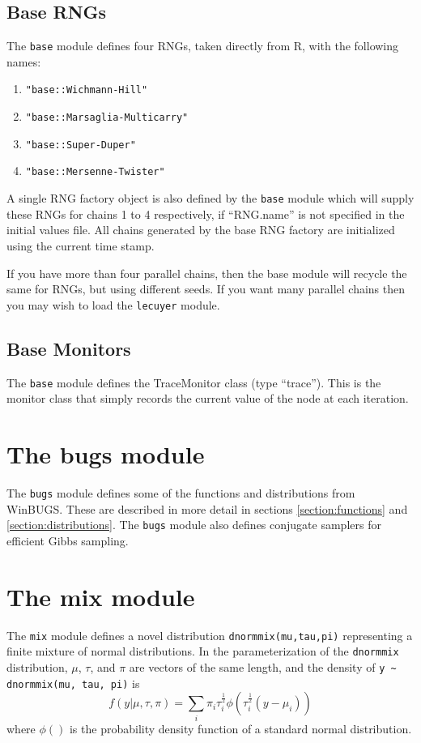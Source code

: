 \documentclass[11pt, a4paper, titlepage]{report}
\newcommand{\WinBUGS}{\textsf{WinBUGS}}
\newcommand{\R}{\textsf{R}}
\begin{document}
\subsection{Base RNGs}

The \verb+base+ module defines four RNGs, taken directly from \R,
with the following names:
\begin{enumerate}
\item \verb+"base::Wichmann-Hill"+
\item \verb+"base::Marsaglia-Multicarry"+
\item \verb+"base::Super-Duper"+
\item \verb+"base::Mersenne-Twister"+
\end{enumerate}

A single RNG factory object is also defined by the \verb+base+
module which will supply these RNGs for chains 1 to 4 respectively, if
``RNG.name'' is not specified in the initial values file.  All chains
generated by the base RNG factory are initialized using the current
time stamp.

If you have more than four parallel chains, then the base module will
recycle the same for RNGs, but using different seeds. If you want many
parallel chains then you may wish to load the \verb+lecuyer+ module.

\subsection{Base Monitors}

The \verb+base+ module defines the TraceMonitor class (type
``trace''). This is the monitor class that simply records the current
value of the node at each iteration.

\section{The bugs module}

The \verb+bugs+ module defines some of the functions and distributions
from \WinBUGS. These are described in more detail in sections
\ref{section:functions} and \ref{section:distributions}.  The
\verb+bugs+ module also defines conjugate samplers for efficient Gibbs
sampling.

\section{The mix module}

The \verb+mix+ module defines a novel distribution
\verb+dnormmix(mu,tau,pi)+ representing a finite mixture of normal
distributions. In the parameterization of the \verb+dnormmix+
distribution, $\mu$, $\tau$, and $\pi$ are vectors of the same length,
and the density of \verb+y ~ dnormmix(mu, tau, pi)+ is
\[
f(y | \mu, \tau, \pi) = \sum_i \pi_i \tau_i^{\frac{1}{2}} \phi( \tau^{\frac{1}{2}}_i (y - \mu_i))
\]
where $\phi()$ is the probability density function of a standard
normal distribution.
\end{document}
